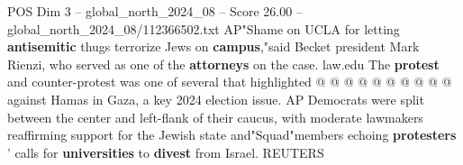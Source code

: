 \begin{textsample}{POS Dim 3 – global\_north\_2024\_08 – Score 26.00 – global\_north\_2024\_08/112366502.txt}
AP"Shame on UCLA for letting \textbf{antisemitic} thugs terrorize Jews on \textbf{campus},"said Becket president Mark Rienzi, who served as one of the \textbf{attorneys} on the case. law.edu The \textbf{protest} and counter-protest was one of several that highlighted @ @ @ @ @ @ @ @ @ @ against Hamas in Gaza, a key 2024 election issue.
AP Democrats were split between the center and left-flank of their caucus, with moderate lawmakers reaffirming support for the Jewish state and"Squad"members echoing \textbf{protesters} ' calls for \textbf{universities} to \textbf{divest} from Israel.
REUTERS

\end{textsample}
